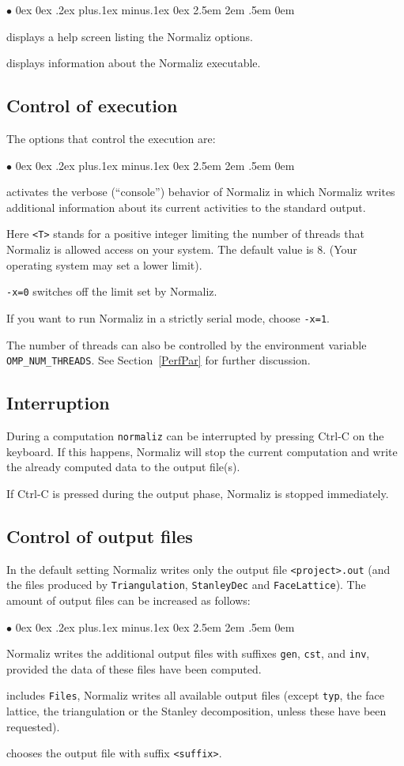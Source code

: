 \documentclass[12pt,a4paper]{scrartcl}
\newcounter{listi}
\newcommand{\stdli}{ \topsep0ex \partopsep0ex %
\parsep.2ex plus.1ex minus.1ex \itemsep0ex%
\leftmargin2.5em \labelwidth2em \labelsep.5em \rightmargin0em}%
\renewenvironment{itemize}{\begin{list}{{$\bullet$}}{\stdli}}{\end{list}}
\theoremstyle{definition}
\def\itemtt[#1]{\item[\textbf{\ttt{#1}}]}
\def\ttt{\texttt}
\begin{document}
\begin{itemize}
	\itemtt [-{}-help, -?] displays a help screen listing the Normaliz options.
	
	\itemtt [-{}-version] displays information about the Normaliz executable.
\end{itemize}


\subsection{Control of execution}\label{exec}

The options that control the execution are:

\begin{itemize}
	\itemtt[{-}{-}verbose, -c] activates the verbose (``console'') behavior of
	Normaliz in which Normaliz writes additional
	information about its current activities to the
	standard output.
	
	\itemtt[-x=<T>] Here \ttt{<T>} stands for a positive
	integer limiting the number of threads that Normaliz
	is allowed access on your system. The default value is
	$8$. (Your operating system may set a lower limit).
	
	\ttt{-x=0} switches off the limit set by Normaliz.
	
	If you want to run
	Normaliz in a strictly serial mode, choose
	\ttt{-x=1}.
\end{itemize}

The number of threads can also be controlled by the environment
variable \verb+OMP_NUM_THREADS+. See Section~\ref{PerfPar} for
further discussion.

\subsection{Interruption}\label{interrupt}

During a computation \verb|normaliz| can be interrupted by pressing Ctrl-C on the keyboard. If this happens, Normaliz will stop the current computation and write the already computed data to the output file(s).

If Ctrl-C is pressed during the output phase, Normaliz is stopped immediately.

\subsection{Control of output files}\label{outcontrol}

In the default setting Normaliz writes only the output file
\ttt{<project>.out} (and the files produced by \ttt{Triangulation}, \ttt{StanleyDec} and \ttt{FaceLattice}). The
amount of output files can be
increased as follows:
\begin{itemize}
	\itemtt[{-}{-}files, -f] Normaliz writes the additional output files
	with suffixes \ttt{gen}, \ttt{cst}, and \ttt{inv},
	provided the data of these files have been computed.
	\itemtt[{-}{-}all-files, -a] includes \ttt{Files}, Normaliz writes all
	available output files (except \verb|typ|, the face lattice, the triangulation or the
	Stanley decomposition, unless these have been requested).
	\itemtt [{-}{-}<suffix>] chooses the output file with suffix \verb|<suffix>|.
\end{itemize}
\end{document}
